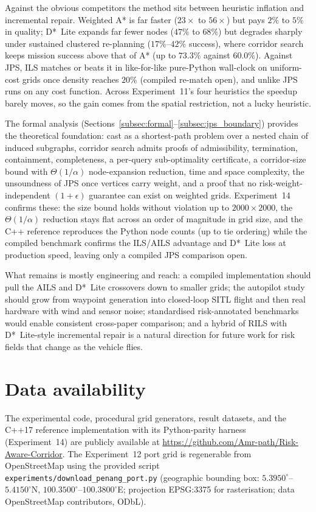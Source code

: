 \documentclass[preprint,12pt,authoryear]{elsarticle}
\begin{document}
Against the obvious competitors the method sits between heuristic inflation and incremental repair. Weighted A* is far faster ($23\times$ to $56\times$) but pays $2\%$ to $5\%$ in quality; D*~Lite expands far fewer nodes ($47\%$ to $68\%$) but degrades sharply under sustained clustered re-planning ($17\%$--$42\%$ success), where corridor search keeps mission success above that of A* (up to $73.3\%$ against $60.0\%$). Against JPS, ILS matches or beats it in like-for-like pure-Python wall-clock on uniform-cost grids once density reaches $20\%$ (compiled re-match open), and unlike JPS runs on any cost function. Across Experiment~11's four heuristics the speedup barely moves, so the gain comes from the spatial restriction, not a lucky heuristic.

The formal analysis (Sections~\ref{subsec:formal}--\ref{subsec:jps_boundary}) provides the theoretical foundation: cast as a shortest-path problem over a nested chain of induced subgraphs, corridor search admits proofs of admissibility, termination, containment, completeness, a per-query sub-optimality certificate, a corridor-size bound with $\Theta(1/\alpha)$ node-expansion reduction, time and space complexity, the unsoundness of JPS once vertices carry weight, and a proof that no risk-weight-independent $(1+\epsilon)$ guarantee can exist on weighted grids. Experiment~14 confirms these: the size bound holds without violation up to $2000\times2000$, the $\Theta(1/\alpha)$ reduction stays flat across an order of magnitude in grid size, and the C++ reference reproduces the Python node counts (up to tie ordering) while the compiled benchmark confirms the ILS/AILS advantage and D*~Lite loss at production speed, leaving only a compiled JPS comparison open.

What remains is mostly engineering and reach: a compiled implementation should pull the AILS and D*~Lite crossovers down to smaller grids; the autopilot study should grow from waypoint generation into closed-loop SITL flight and then real hardware with wind and sensor noise; standardised risk-annotated benchmarks would enable consistent cross-paper comparison; and a hybrid of RILS with D*~Lite-style incremental repair is a natural direction for future work for risk fields that change as the vehicle flies.

\section*{Data availability}
The experimental code, procedural grid generators, result datasets, and the C++17 reference implementation with its Python-parity harness (Experiment~14) are publicly available at \url{https://github.com/Amr-path/Risk-Aware-Corridor}.
The Experiment~12 port grid is regenerable from OpenStreetMap using the provided script \texttt{experiments/download\_penang\_port.py} (geographic bounding box: $5.3950^\circ$--$5.4150^\circ$N, $100.3500^\circ$--$100.3800^\circ$E; projection EPSG:3375 for rasterisation; data \textcopyright{} OpenStreetMap contributors, ODbL).
\end{document}
